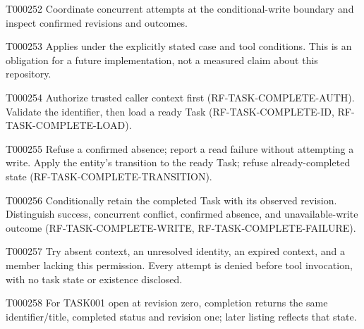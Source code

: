 \documentclass[11pt,a4paper]{article}
\begin{document}
\begin{atlasparagraph}{T000252}
Coordinate concurrent attempts at the conditional-write boundary and inspect confirmed revisions and outcomes.
\end{atlasparagraph}
\begin{atlasparagraph}{T000253}
Applies under the explicitly stated case and tool conditions. This is an obligation for a future implementation, not a measured claim about this repository.
\end{atlasparagraph}
\begin{atlasparagraph}{T000254}
Authorize trusted caller context first (RF-TASK-COMPLETE-AUTH). Validate the identifier, then load a ready Task (RF-TASK-COMPLETE-ID, RF-TASK-COMPLETE-LOAD).
\end{atlasparagraph}
\begin{atlasparagraph}{T000255}
Refuse a confirmed absence; report a read failure without attempting a write. Apply the entity's transition to the ready Task; refuse already-completed state (RF-TASK-COMPLETE-TRANSITION).
\end{atlasparagraph}
\begin{atlasparagraph}{T000256}
Conditionally retain the completed Task with its observed revision. Distinguish success, concurrent conflict, confirmed absence, and unavailable-write outcome (RF-TASK-COMPLETE-WRITE, RF-TASK-COMPLETE-FAILURE).
\end{atlasparagraph}
\begin{atlasparagraph}{T000257}
Try absent context, an unresolved identity, an expired context, and a member lacking this permission. Every attempt is denied before tool invocation, with no task state or existence disclosed.
\end{atlasparagraph}
\begin{atlasparagraph}{T000258}
For TASK001 open at revision zero, completion returns the same identifier/title, completed status and revision one; later listing reflects that state.
\end{atlasparagraph}
\end{document}
